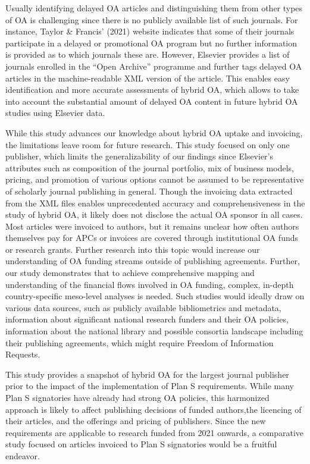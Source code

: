 \documentclass[a4paper,man,floatsintext,longtable,noextraspace,12pt]{apa6}
\begin{document}
Usually identifying delayed OA articles and distinguishing them from
other types of OA is challenging since there is no publicly available
list of such journals. For instance, Taylor \& Francis' (2021) website
indicates that some of their journals participate in a delayed or
promotional OA program but no further information is provided as to
which journals these are. However, Elsevier provides a list of journals
enrolled in the ``Open Archive'' programme and further tags delayed OA
articles in the machine-readable XML version of the article. This
enables easy identification and more accurate assessments of hybrid OA,
which allows to take into account the substantial amount of delayed OA
content in future hybrid OA studies using Elsevier data.

While this study advances our knowledge about hybrid OA uptake and
invoicing, the limitations leave room for future research. This study
focused on only one publisher, which limits the generalizability of our
findings since Elsevier's attributes such as composition of the journal
portfolio, mix of business models, pricing, and promotion of various
options cannot be assumed to be representative of scholarly journal
publishing in general. Though the invoicing data extracted from the XML
files enables unprecedented accuracy and comprehensiveness in the study
of hybrid OA, it likely does not disclose the actual OA sponsor in all
cases. Most articles were invoiced to authors, but it remains unclear
how often authors themselves pay for APCs or invoices are covered
through institutional OA funds or research grants. Further research into
this topic would increase our understanding of OA funding streams
outside of publishing agreements. Further, our study demonstrates that
to achieve comprehensive mapping and understanding of the financial
flows involved in OA funding, complex, in-depth country-specific
meso-level analyses is needed. Such studies would ideally draw on
various data sources, such as publicly available bibliometrics and
metadata, information about significant national research funders and
their OA policies, information about the national library and possible
consortia landscape including their publishing agreements, which might
require Freedom of Information Requests.

This study provides a snapshot of hybrid OA for the largest journal
publisher prior to the impact of the implementation of Plan S
requirements. While many Plan S signatories have already had strong OA
policies, this harmonized approach is likely to affect publishing
decisions of funded authors,the licencing of their articles, and the
offerings and pricing of publishers. Since the new requirements are
applicable to research funded from 2021 onwards, a comparative study
focused on articles invoiced to Plan S signatories would be a fruitful
endeavor.
\end{document}
